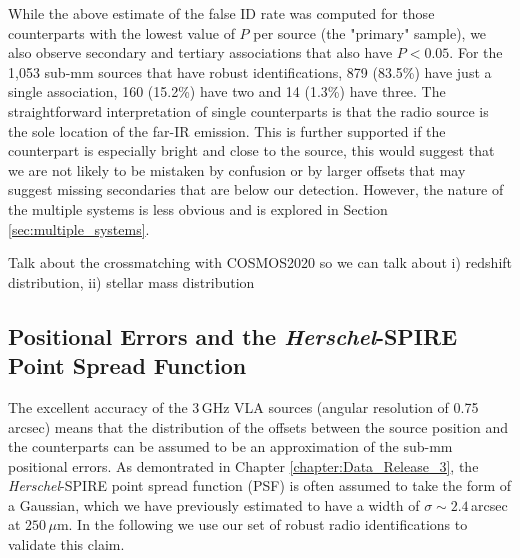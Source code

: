 While the above estimate of the false ID rate was computed for those counterparts with the lowest value of $P$ per source (the "primary" sample), we also observe secondary and tertiary associations that also have $P < 0.05$. For the 1,053 sub-mm sources that have robust identifications, 879 (83.5\%) have just a single association, 160 (15.2\%) have two and 14 (1.3\%) have three. The straightforward interpretation of single counterparts is that the radio source is the sole location of the far-IR emission. This is further supported if the counterpart is especially bright and close to the source, this would suggest that we are not likely to be mistaken by confusion or by larger offsets that may suggest missing secondaries that are below our detection. However, the nature of the multiple systems is less obvious and is explored in Section \ref{sec:multiple_systems}.

{\color{red}Talk about the crossmatching with COSMOS2020 so we can talk about i) redshift distribution, ii) stellar mass distribution}

\subsection{Positional Errors and the \textit{Herschel}-SPIRE Point Spread Function}

The excellent accuracy of the 3\,GHz VLA sources (angular resolution of 0.75\,arcsec) means that the distribution of the offsets between the source position and the counterparts can be assumed to be an approximation of the sub-mm positional errors. As demontrated in Chapter \ref{chapter:Data_Release_3}, the \textit{Herschel}-SPIRE point spread function (PSF) is often assumed to take the form of a Gaussian, which we have previously estimated to have a width of $\sigma \sim 2.4$\,arcsec at $250\,\mu$m. In the following we use our set of robust radio identifications to validate this claim.

